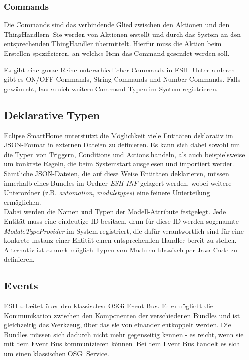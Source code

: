 \subsubsection{Commands}
Die Commands sind das verbindende Glied zwischen den Aktionen und den ThingHandlern. Sie werden von Aktionen erstellt und durch das System an den entsprechenden ThingHandler übermittelt. Hierfür muss die Aktion beim Erstellen spezifizieren, an welches Item das Command gesendet werden soll. 

Es gibt eine ganze Reihe unterschiedlicher Commands in ESH. Unter anderen gibt es ON/OFF-Commands, String-Commands und Number-Commands. Falls gewünscht, lassen sich weitere Command-Typen im System registrieren.


\subsection{Deklarative Typen}
\label{subsec:decltypes}
Eclipse SmartHome unterstützt die Möglichkeit viele Entitäten deklarativ im JSON-Format\cite{json} in externen Dateien zu definieren. Es kann sich dabei sowohl um die Typen von Triggern, Conditions und Actions handeln, als auch beispielsweise um konkrete Regeln, die beim Systemstart ausgelesen und importiert werden. Sämtliche JSON-Dateien, die auf diese Weise Entitäten deklarieren, müssen innerhalb eines Bundles im Ordner \textit{ESH-INF} gelagert werden, wobei weitere Unterordner (z.B. \textit{automation}, \textit{moduletypes}) eine feinere Unterteilung ermöglichen. \\

Dabei werden die Namen und Typen der Modell-Attribute festgelegt. Jede Entität muss eine eindeutige ID besitzen, denn für diese ID werden sogenannte \textit{ModuleTypeProvider} im System registriert, die dafür verantwortlich sind für eine konkrete Instanz einer Entität einen entsprechenden Handler bereit zu stellen.\\

Alternativ ist es auch möglich Typen von Modulen klassisch per Java-Code zu definieren.

\subsection{Events}
ESH arbeitet über den klassischen OSGi Event Bus. Er ermöglicht die Kommunikation zwischen den Komponenten der verschiedenen Bundles und ist gleichzeitig das Werkzeug, über das sie von einander entkoppelt werden. Die Bundles müssen sich dadurch nicht mehr gegenseitig kennen - es reicht, wenn sie mit dem Event Bus kommunizieren können. Bei dem Event Bus handelt es sich um einen klassischen OSGi Service.

